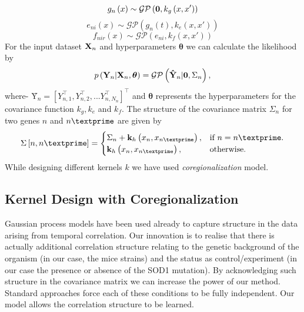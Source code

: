 \begin{equation} \label{eq:hGPn}
g_n\left(x\right) \sim \mathcal{GP} \left(\textbf 0,k_g\left(x,x' \right)\right)
\end{equation}
\begin{equation} \label{eq:hGPni}
e_{ni}\left(x\right) \sim \mathcal{GP} \left(g_n\left(t\right),k_e\left(x,x' \right)\right)
\end{equation}
\begin{equation} \label{eq:hGPnir}
f_{nir}\left(x\right) \sim \mathcal{GP} \left(e_{ni},k_f\left(x,x' \right)\right)
\end{equation}
For the input dataset ${\textbf X}_n$ and hyperparameters $\boldsymbol{\theta}$ we can calculate the 
likelihood by
\begin{equation} \label{eq:LikelihoodHGP}
p\left(\textbf{Y}_n | \textbf{X}_n, \boldsymbol{\theta}\right) = \mathcal{GP} \left(\textbf {\^{Y}}_n|\textbf 0, \Sigma_n\right),
\end{equation}
where-
$\textbf {\^{Y}}_n= {\left[Y_{n,1}^\top,Y_{n,2}^\top, ... Y_{n,N_n}^\top\right]}^\top$ and $\boldsymbol{\theta}$ 
represents the hyperparameters for the covariance function $k_g,k_e$ and $k_f$.
The structure of the covariance matrix $\Sigma_n$ for two genes $n$ and $n\textprime$ are 
given by
\begin{equation}
  \Sigma\left[n,n\textprime\right]=\begin{cases}
    \Sigma_n+\textbf{k}_h\left(x_n,x_{n\textprime}\right), & \text{if $n=n\textprime$}.\\
    \textbf{k}_h\left(x_n,x_{n\textprime}\right), & \text{otherwise}.
  \end{cases}
\end{equation}
While designing different kernels $k$ we have used \emph{coregionalization} model. 

\subsection{Kernel Design with Coregionalization}

Gaussian process models have been used already to capture structure in the data arising from temporal correlation. Our innovation is to realise that there is actually additional correlation structure relating to the genetic background of the organism (in our case, the mice strains) and the status as control/experiment (in our case the presence or absence of the SOD1 mutation). By acknowledging such structure in the covariance matrix we can increase the power of our method. Standard approaches force each of these conditions to be fully independent. Our model allows the correlation structure to be learned.

